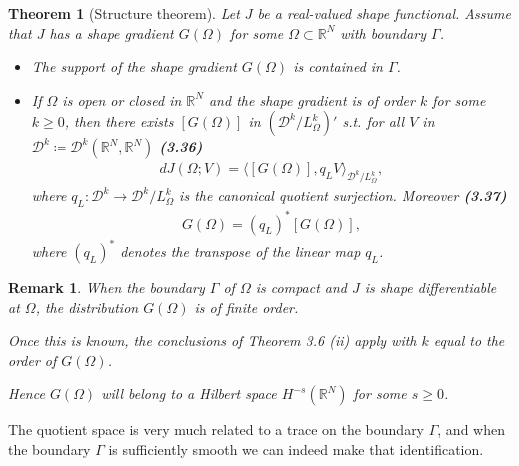 \documentclass[oneside]{book}
\numberwithin{equation}{section}
\newtheorem{theorem}{Theorem}[section]
\newtheorem{remark}{Remark}[section]
\begin{document}
\begin{theorem}[Structure theorem]
    Let $J$ be a real-valued shape functional. Assume that $J$ has a shape gradient $G(\Omega)$ for some $\Omega\subset\mathbb{R}^N$ with boundary $\Gamma$.
    \begin{itemize}
        \item[(i)] The support of the shape gradient $G(\Omega)$ is contained in $\Gamma$.
        \item[(ii)] If $\Omega$ is open or closed in $\mathbb{R}^N$ and the shape gradient is of order $k$ for some $k\ge 0$, then there exists $[G(\Omega)]$ in $\left(\mathcal{D}^k/L_\Omega^k\right)'$ s.t. for all $V$ in $\mathcal{D}^k\coloneqq\mathcal{D}^k(\mathbb{R}^N,\mathbb{R}^N)$ \textbf{(3.36)}
        \begin{align*}
            dJ(\Omega;V) = \langle[G(\Omega)],q_LV\rangle_{\mathcal{D}^k/L_\Omega^k},
        \end{align*}
        where $q_L:\mathcal{D}^k\to\mathcal{D}^k/L_\Omega^k$ is the canonical quotient surjection. Moreover \textbf{(3.37)}
        \begin{align*}
            G(\Omega) = (q_L)^*[G(\Omega)],
        \end{align*}
        where $(q_L)^*$ denotes the transpose of the linear map $q_L$.
    \end{itemize}
\end{theorem}

\begin{remark}
    When the boundary $\Gamma$ of $\Omega$ is compact and $J$ is shape differentiable at $\Omega$, the distribution $G(\Omega)$ is of finite order.
    
    Once this is known, the conclusions of Theorem 3.6 (ii) apply with $k$ equal to the order of $G(\Omega)$.
    
    Hence $G(\Omega)$ will belong to a Hilbert space $H^{-s}(\mathbb{R}^N)$ for some $s\ge 0$.
\end{remark}
The quotient space is very much related to a trace on the boundary $\Gamma$, and when the boundary $\Gamma$ is sufficiently smooth we can indeed make that identification.
\end{document}
